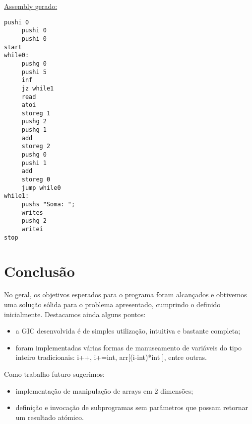 \documentclass{report}
\begin{document}
\underline{Assembly gerado:}

\begin{verbatim}
pushi 0
     pushi 0
     pushi 0
start
while0:
     pushg 0
     pushi 5
     inf
     jz while1
     read
     atoi
     storeg 1
     pushg 2
     pushg 1
     add
     storeg 2
     pushg 0
     pushi 1
     add
     storeg 0
     jump while0
while1:
     pushs "Soma: ";
     writes
     pushg 2
     writei
stop
\end{verbatim}


\chapter{Conclusão} \label{concl}
No geral, os objetivos esperados para o programa foram alcançados e obtivemos uma solução sólida para o problema apresentado, cumprindo o definido inicialmente.
Destacamos ainda alguns pontos:
\begin{itemize}
\item a GIC desenvolvida é de simples utilização, intuitiva e bastante completa;
\item foram implementadas várias formas de manuseamento de variáveis do tipo inteiro tradicionais: i++, i+=int,  arr[(i-int)*int ], entre outras.
\end{itemize}
\newline
Como trabalho futuro sugerimos:
\begin{itemize}
\item implementação de manipulação de arrays em 2 dimensões;
\item definição e invocação de subprogramas sem parâmetros que possam retornar um resultado atómico.
\end{itemize}



\end{document}
